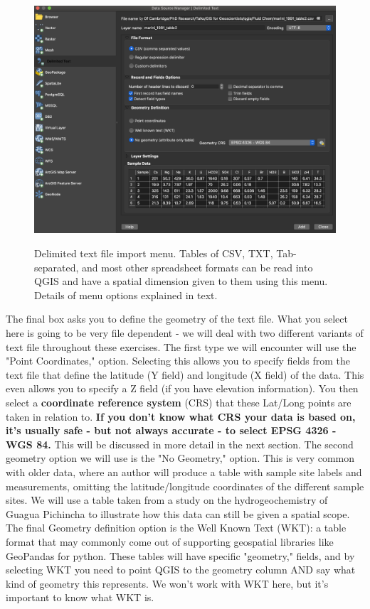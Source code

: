 \documentclass{article}
\begin{document}
\begin{figure}[htbp]
    \centering
    \includegraphics[width=\textwidth]{Fig_13_CSV_example.png}
    \label{fig13}
    \caption{Delimited text file import menu. Tables of CSV, TXT, Tab-separated, and most other spreadsheet formats can be read into QGIS and have a spatial dimension given to them using this menu. Details of menu options explained in text.}
\end{figure}

The final box asks you to define the geometry of the text file. What you select here is going to be very file dependent - we will deal with two different variants of text file throughout these exercises. The first type we will encounter will use the "Point Coordinates," option. Selecting this allows you to specify fields from the text file that define the latitude (Y field) and longitude (X field) of the data. This even allows you to specify a Z field (if you have elevation information). You then select a \textbf{coordinate reference system} (CRS) that these Lat/Long points are taken in relation to. \textbf{If you don't know what CRS your data is based on, it's usually safe - but not always accurate - to select EPSG 4326 - WGS 84.} This will be discussed in more detail in the next section.  The second geometry option we will use is the "No Geometry," option. This is very common with older data, where an author will produce a table with sample site labels and measurements, omitting the latitude/longitude coordinates of the different sample sites.  We will use a table taken from a study on the hydrogeochemistry of Guagua Pichincha to illustrate how this data can still be given a spatial scope. The final Geometry definition option is the Well Known Text (WKT): a table format that may commonly come out of supporting geospatial libraries like GeoPandas for python. These tables will have specific "geometry," fields, and by selecting WKT you need to point QGIS to the geometry column AND say what kind of geometry this represents. We won't work with WKT here, but it's important to know what WKT is. 
\end{document}
